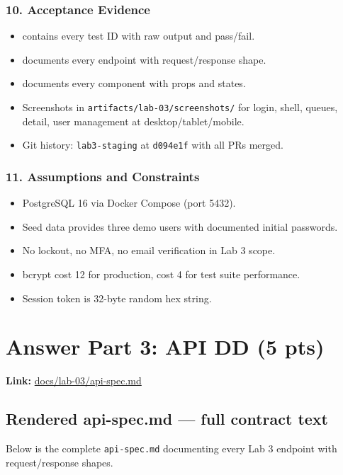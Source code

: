 \documentclass[11pt,a4paper]{article}
\begin{document}
\subsubsection*{10. Acceptance Evidence}
\begin{itemize}
\item {} contains every test ID with raw output and pass/fail.
\item {} documents every endpoint with request/response shape.
\item {} documents every component with props and states.
\item Screenshots in \texttt{artifacts/lab-03/screenshots/} for login, shell, queues, detail, user management at desktop/tablet/mobile.
\item Git history: \texttt{lab3-staging} at \texttt{d094e1f} with all PRs merged.
\end{itemize}

\subsubsection*{11. Assumptions and Constraints}
\begin{itemize}
\item PostgreSQL 16 via Docker Compose (port 5432).
\item Seed data provides three demo users with documented initial passwords.
\item No lockout, no MFA, no email verification in Lab 3 scope.
\item bcrypt cost 12 for production, cost 4 for test suite performance.
\item Session token is 32-byte random hex string.
\end{itemize}

\section*{Answer Part 3: API DD (5 pts)}

\textbf{Link:} \href{https://github.com/thhanabun/Software\_Eng\_Lab/blob/main/docs/lab-03/api-spec.md}{docs/lab-03/api-spec.md}

\subsection*{Rendered api-spec.md --- full contract text}
Below is the complete \texttt{api-spec.md} documenting every Lab 3 endpoint with request/response shapes.
\end{document}
